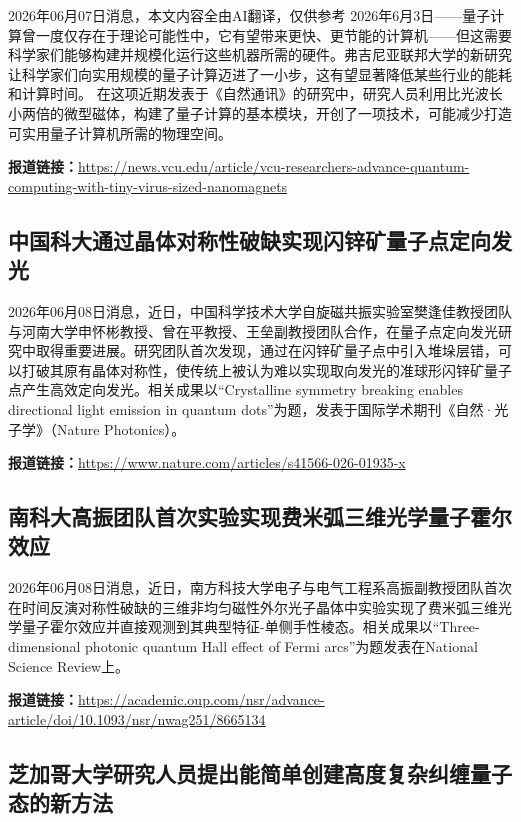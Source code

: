 \documentclass[12pt,a4paper]{ctexart}
\begin{document}
2026年06月07日消息，本文内容全由AI翻译，仅供参考
2026年6月3日——量子计算曾一度仅存在于理论可能性中，它有望带来更快、更节能的计算机——但这需要科学家们能够构建并规模化运行这些机器所需的硬件。弗吉尼亚联邦大学的新研究让科学家们向实用规模的量子计算迈进了一小步，这有望显著降低某些行业的能耗和计算时间。
在这项近期发表于《自然通讯》的研究中，研究人员利用比光波长小两倍的微型磁体，构建了量子计算的基本模块，开创了一项技术，可能减少打造可实用量子计算机所需的物理空间。


\noindent\textbf{报道链接：}\url{https://news.vcu.edu/article/vcu-researchers-advance-quantum-computing-with-tiny-virus-sized-nanomagnets}

\subsection{ 中国科大通过晶体对称性破缺实现闪锌矿量子点定向发光 }

2026年06月08日消息，近日，中国科学技术大学自旋磁共振实验室樊逢佳教授团队与河南大学申怀彬教授、曾在平教授、王垒副教授团队合作，在量子点定向发光研究中取得重要进展。研究团队首次发现，通过在闪锌矿量子点中引入堆垛层错，可以打破其原有晶体对称性，使传统上被认为难以实现取向发光的准球形闪锌矿量子点产生高效定向发光。相关成果以“Crystalline symmetry breaking enables directional light emission in quantum dots”为题，发表于国际学术期刊《自然·光子学》（Nature Photonics）。


\noindent\textbf{报道链接：}\url{https://www.nature.com/articles/s41566-026-01935-x}

\subsection{ 南科大高振团队首次实验实现费米弧三维光学量子霍尔效应 }

2026年06月08日消息，近日，南方科技大学电子与电气工程系高振副教授团队首次在时间反演对称性破缺的三维非均匀磁性外尔光子晶体中实验实现了费米弧三维光学量子霍尔效应并直接观测到其典型特征-单侧手性棱态。相关成果以“Three-dimensional photonic quantum Hall effect of Fermi arcs”为题发表在National Science Review上。


\noindent\textbf{报道链接：}\url{https://academic.oup.com/nsr/advance-article/doi/10.1093/nsr/nwag251/8665134}

\subsection{ 芝加哥大学研究人员提出能简单创建高度复杂纠缠量子态的新方法 }
\end{document}
